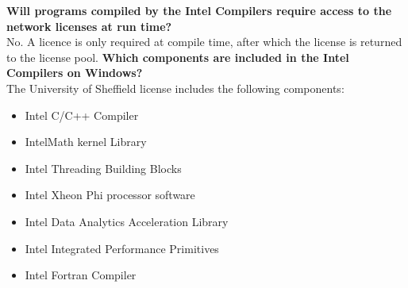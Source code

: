 \documentclass[10pt,a4paper,oneside]{article}
\begin{document}
\textbf{Will programs compiled by the Intel Compilers require access to the network licenses at run time?}\\
No. A licence is only required at compile time, after which the license is returned to the license pool.
\textbf{Which components are included in the Intel Compilers on Windows?}\\
The University of Sheffield license includes the following components:
\begin{itemize}
\item Intel C/C++ Compiler
\item IntelMath kernel Library
\item Intel Threading Building Blocks
\item Intel Xheon Phi processor software
\item Intel Data Analytics Acceleration Library 
\item Intel Integrated Performance Primitives
\item Intel Fortran Compiler
\end{itemize}
\end{document}
